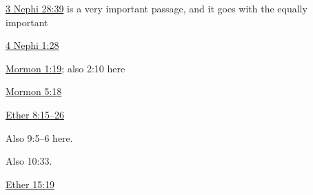 \begin{compactitem}
			\item \hyperref[3NEPHI-28-39]{3 Nephi 28:39} is a very important passage, and it goes with the equally important 
			\item \hyperref[4NEPHI-1-28]{4 Nephi 1:28}
			\item \hyperref[MORMON-1-19]{Mormon 1:19}; also 2:10 here
			\item \hyperref[MORMON-5-18]{Mormon 5:18}
			\item \hyperref[ETHER-8-15]{Ether 8:15--26}
				\begin{compactitem}
					\item Also 9:5--6 here.
					\item Also 10:33.
				\end{compactitem}
			\item \hyperref[ETHER-15-19]{Ether 15:19}
		\end{compactitem}